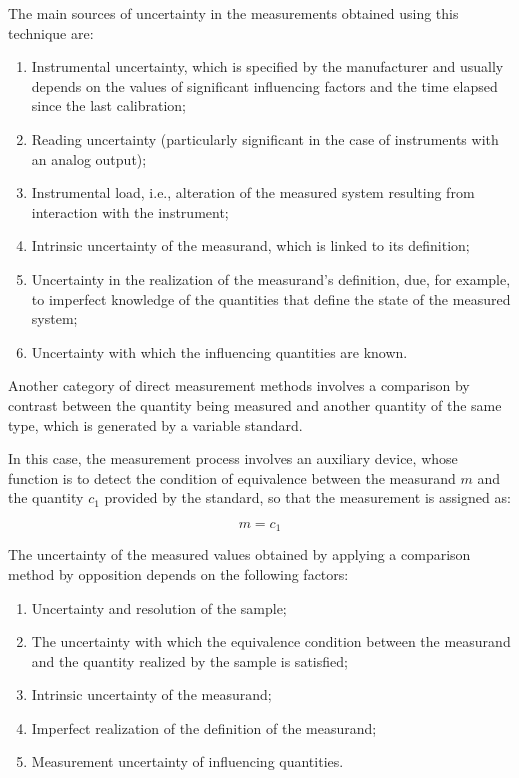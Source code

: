 \documentclass[../main.tex]{subfiles}
\begin{document}
The main sources of uncertainty in the measurements obtained using this technique are:

\begin{enumerate}
	\item[\textbf{-}] Instrumental uncertainty, which is specified by the manufacturer and usually depends on the values of significant influencing factors and the time elapsed since the last calibration;
	
	\item[\textbf{-}] Reading uncertainty (particularly significant in the case of instruments with an analog output);
	
	\item[\textbf{-}] Instrumental load, i.e., alteration of the measured system resulting from interaction with the instrument;

	\item[\textbf{-}] Intrinsic uncertainty of the measurand, which is linked to its definition;
	
	\item[\textbf{-}] Uncertainty in the realization of the measurand’s definition, due, for example, to imperfect knowledge of the quantities that define the state of the measured system;

	\item[\textbf{-}] Uncertainty with which the influencing quantities are known.
\end{enumerate}

Another category of direct measurement methods involves a comparison by contrast between the quantity being measured and another quantity of the same type, which is generated by a variable standard. 

In this case, the measurement process involves an auxiliary device, whose function is to detect the condition of equivalence between the measurand $m$ and the quantity $c_1$ provided by the standard, so that the measurement is assigned as:

\begin{equation}
	m = c_1
\end{equation}

The uncertainty of the measured values obtained by applying a comparison method by opposition depends on the following factors:

\begin{enumerate}
	\item[\textbf{-}] Uncertainty and resolution of the sample;
	\item[\textbf{-}] The uncertainty with which the equivalence condition between the measurand and the quantity realized by the sample is satisfied;
	\item[\textbf{-}] Intrinsic uncertainty of the measurand;
	\item[\textbf{-}] Imperfect realization of the definition of the measurand;
	\item[\textbf{-}] Measurement uncertainty of influencing quantities.
\end{enumerate}
\end{document}
